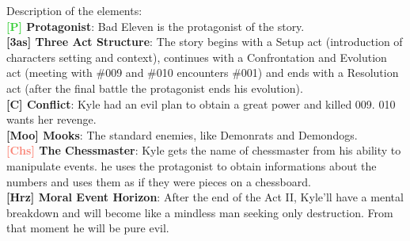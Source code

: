 Description of the elements:\\
\textbf{\textcolor{LimeGreen}{[P]} Protagonist}: Bad Eleven is the protagonist of the story.\\
\textbf{\textcolor{dark-gray}{[3as]} Three Act Structure}: The story begins with a Setup act (introduction of characters setting and context), continues with a Confrontation and Evolution act (meeting with \#009 and \#010 encounters \#001) and ends with a Resolution act (after the final battle the protagonist ends his evolution).\\
\textbf{\textcolor{dark-gray}{[C]} Conflict}: Kyle had an evil plan to obtain a great power and killed 009. 010 wants her revenge.\\
\textbf{\textcolor{OliveGreen}{[Moo]} Mooks}: The standard enemies, like Demonrats and Demondogs.\\
\textbf{\textcolor{Salmon}{[Chs]} The Chessmaster}: Kyle gets the name of chessmaster from his ability to manipulate events. he uses the protagonist to obtain informations about the numbers and uses them as if they were pieces on a chessboard.\\
\textbf{\textcolor{light-gray}{[Hrz]} Moral Event Horizon}: After the end of the Act II, Kyle'll have a mental breakdown and will become like a mindless man seeking only destruction. From that moment he will be pure evil.\\